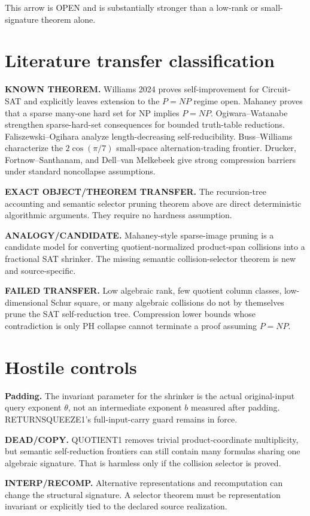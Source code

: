 \documentclass[11pt]{article}
\begin{document}
This arrow is OPEN and is substantially stronger than a low-rank or small-signature theorem alone.

\section*{Literature transfer classification}
\textbf{KNOWN THEOREM.}
Williams 2024 proves self-improvement for Circuit-SAT and explicitly leaves extension to the \(P=NP\) regime open. Mahaney proves that a sparse many-one hard set for NP implies \(P=NP\). Ogiwara--Watanabe strengthen sparse-hard-set consequences for bounded truth-table reductions. Faliszewski--Ogihara analyze length-decreasing self-reducibility. Buss--Williams characterize the \(2\cos(\pi/7)\) small-space alternation-trading frontier. Drucker, Fortnow--Santhanam, and Dell--van Melkebeek give strong compression barriers under standard noncollapse assumptions.

\textbf{EXACT OBJECT/THEOREM TRANSFER.}
The recursion-tree accounting and semantic selector pruning theorem above are direct deterministic algorithmic arguments. They require no hardness assumption.

\textbf{ANALOGY/CANDIDATE.}
Mahaney-style sparse-image pruning is a candidate model for converting quotient-normalized product-span collisions into a fractional SAT shrinker. The missing semantic collision-selector theorem is new and source-specific.

\textbf{FAILED TRANSFER.}
Low algebraic rank, few quotient column classes, low-dimensional Schur square, or many algebraic collisions do not by themselves prune the SAT self-reduction tree. Compression lower bounds whose contradiction is only PH collapse cannot terminate a proof assuming \(P=NP\).

\section*{Hostile controls}
\textbf{Padding.}
The invariant parameter for the shrinker is the actual original-input query exponent \(\theta\), not an intermediate exponent \(b\) measured after padding. RETURNSQUEEZE1's full-input-carry guard remains in force.

\textbf{DEAD/COPY.}
QUOTIENT1 removes trivial product-coordinate multiplicity, but semantic self-reduction frontiers can still contain many formulas sharing one algebraic signature. That is harmless only if the collision selector is proved.

\textbf{INTERP/RECOMP.}
Alternative representations and recomputation can change the structural signature. A selector theorem must be representation invariant or explicitly tied to the declared source realization.
\end{document}
